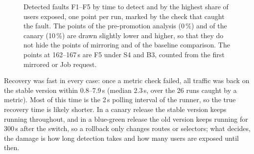\begin{figure}[ht]
	\centering
	\caption{Detected faults F1--F5 by time to detect and by the highest share of users exposed, one point per run, marked by the check that caught the fault. The points of the pre-promotion analysis (0\,\%) and of the canary (10\,\%) are drawn slightly lower and higher, so that they do not hide the points of mirroring and of the baseline comparison. The points at 162--167\,s are F5 under S4 and B3, counted from the first mirrored or Job request.}
	\label{fig:EvalScatter}
\end{figure}

Recovery was fast in every case: once a metric check failed, all traffic was back on the stable version within 0.8--7.9\,s (median 2.3\,s, over the 26 runs caught by a metric). Most of this time is the 2\,s polling interval of the runner, so the true recovery time is likely shorter. In a canary release the stable version keeps running throughout, and in a blue-green release the old version keeps running for 300\,s after the switch, so a rollback only changes routes or selectors; what decides, the damage is how long detection takes and how many users are exposed until then.

